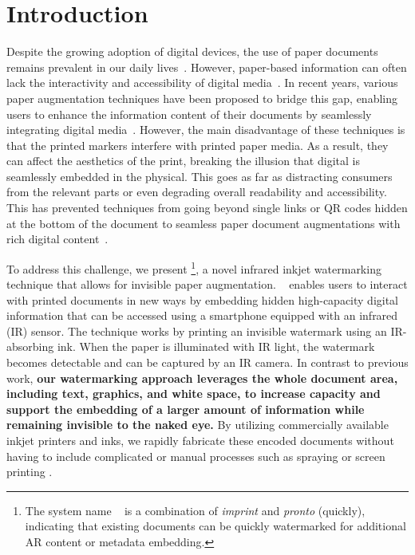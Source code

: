 
\section{Introduction}

Despite the growing adoption of digital devices, the use of paper documents remains prevalent in our daily lives~\cite{gitelman_paper_2014}.
However, paper-based information can often lack the interactivity and accessibility of digital media~\cite{holman_paper_2005}.
In recent years, various paper augmentation techniques have been proposed to bridge this gap, enabling users to enhance the information content of their documents by seamlessly integrating digital media~\cite{han_hybrid_2021, li_holodoc_2019, rajaram_paper_2022}.
However, the main disadvantage of these techniques is that the printed markers interfere with printed paper media. 
As a result, they can affect the aesthetics of the print, breaking the illusion that digital is seamlessly embedded in the physical.
This goes as far as distracting consumers from the relevant parts or even degrading overall readability and accessibility.  
This has prevented techniques from going beyond single links or QR codes hidden at the bottom of the document to seamless paper document augmentations with rich digital content~\cite{dogan_standarone_2023}.




To address this challenge, we present \systemName\footnote{The system name \systemName~ is a combination of \textit{imprint} and \textit{pronto} (quickly), indicating that existing documents can be quickly watermarked for additional AR content or metadata embedding.}, a novel infrared inkjet watermarking technique that allows for invisible paper augmentation.
\systemName~ enables users to interact with printed documents in new ways by embedding hidden high-capacity digital information that can be accessed using a smartphone equipped with an infrared (IR) sensor. The technique works by printing an invisible watermark using an IR-absorbing ink. When the paper is illuminated with IR light, the watermark becomes detectable and can be captured by an IR camera.
In contrast to previous work, \textbf{our watermarking approach leverages the whole document area, including text, graphics, and white space, to increase capacity and support the embedding of a larger amount of information while remaining invisible to the naked eye.}
By utilizing commercially available inkjet printers and inks, we rapidly fabricate these encoded documents without having to include complicated or manual processes such as spraying \cite{willis_hideout_2013} or screen printing \cite{kim_ministudio_2016}.

